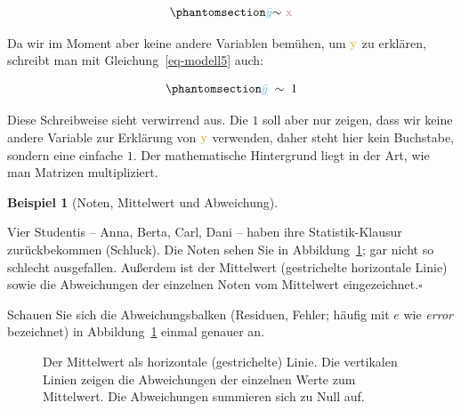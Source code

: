 \documentclass[
  letterpaper,
]{scrbook}
\theoremstyle{definition}
\newtheorem{example}{Beispiel}[chapter]
\theoremstyle{definition}
\theoremstyle{definition}
\theoremstyle{remark}
\begin{document}
\begin{equation}\phantomsection\label{eq-modell5a}{\color{modelcol}{\bar{y}} \color{black}  { \sim } \color{xcol}{\text{ x}}}\end{equation}

Da wir im Moment aber keine andere Variablen bemühen, um
\(\color{ycol}{\text{y}}\) zu erklären, schreibt man mit
Gleichung~\ref{eq-modell5} auch:

\begin{equation}\phantomsection\label{eq-modell5}{\color{modelcol}{\bar{y}}\;\;  \color{black}{\sim \; 1}}\end{equation}

Diese Schreibweise sieht verwirrend aus. Die \(1\) soll aber nur zeigen,
dass wir keine andere Variable zur Erklärung von
\(\color{ycol}{\text{y}}\) verwenden, daher steht hier kein Buchstabe,
sondern eine einfache \(1\). Der mathematische Hintergrund liegt in der
Art, wie man Matrizen multipliziert.

\begin{example}[Noten, Mittelwert und
Abweichung]\protect\hypertarget{exm-noten}{}\label{exm-noten}

Vier Studentis -- Anna, Berta, Carl, Dani -- haben ihre
Statistik-Klausur zurückbekommen (Schluck). Die Noten sehen Sie in
Abbildung~\ref{fig-mw1}; gar nicht so schlecht ausgefallen. Außerdem ist
der Mittelwert (gestrichelte horizontale Linie) sowie die Abweichungen
der einzelnen Noten vom Mittelwert eingezeichnet.\(\square\)

\end{example}

Schauen Sie sich die Abweichungsbalken (Residuen, Fehler; häufig mit
\(e\) wie \emph{error} bezeichnet) in Abbildung~\ref{fig-mw1} einmal
genauer an.

\begin{figure}


\caption{\label{fig-mw1}Der Mittelwert als horizontale (gestrichelte)
Linie. Die vertikalen Linien zeigen die Abweichungen der einzelnen Werte
zum Mittelwert. Die Abweichungen summieren sich zu Null auf.}

\end{figure}%
\end{document}

